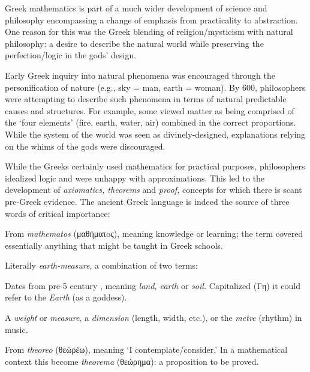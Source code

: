 \goodbreak

Greek mathematics is part of a much wider development of science and philosophy encompassing a change of emphasis from practicality to abstraction. One reason for this was the Greek blending of religion/mysticism with natural philosophy: a desire to describe the natural world while preserving the perfection/logic in the gods' design.\smallbreak

Early Greek inquiry into natural phenomena was encouraged through the personification of nature (e.g., sky = man, earth = woman). By 600\BC, philosophers were attempting to describe such phenomena in terms of natural predictable causes and structures. For example, some viewed matter as being comprised of the `four elements' (fire, earth, water, air) combined in the correct proportions. While the system of the world was seen as divinely-designed, explanations relying on the whims of the gods were discouraged.\smallbreak

While the Greeks certainly used mathematics for practical purposes, philosophers idealized logic and were unhappy with approximations. This led to the development of \emph{axiomatics, theorems} and \emph{proof,} concepts for which there is scant pre-Greek evidence. The ancient Greek language is indeed the source of three words of critical importance:\vspace{-3pt}
\begin{description}\itemsep0pt
	\item[\emph{Mathematics}] From \emph{mathematos} (μαθήματoς), meaning knowledge or learning; the term covered essentially anything that might be taught in Greek schools.
	\item[\emph{Geometry}] Literally \emph{earth-measure}, a combination of two terms:\vspace{-6pt}
	\begin{description}\itemsep0pt
	\item[\normalfont\emph{Gi} (γη)] Dates from pre-5\th{} century \!\BC{}, meaning \emph{land, earth} or \emph{soil.} Capitalized (Γη) it could refer to the \emph{Earth} (as a goddess).
	\item[\normalfont\emph{Metron} (μέτρoν)] A \emph{weight} or \emph{measure}, a \emph{dimension}  (length, width, etc.), or the \emph{metre} (rhythm) in music.
	\end{description}\vspace{-6pt}
	\item[\emph{Theorem}] From \emph{theoreo} (θεώρέω), meaning `I contemplate/consider.' In a mathematical context this become \emph{theorema} (θεώρημα): a proposition to be proved.
\end{description}

